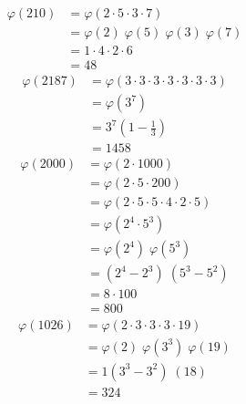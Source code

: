 \documentclass[12pt]{book}
\begin{document}
\begin{soln}
    \begin{align*}
        \varphi(210) & =\varphi(2\cdot 5\cdot3\cdot7)                   \\
                     & =\varphi(2)\;\varphi( 5)\;\varphi(3)\;\varphi(7) \\
                     & =1\cdot4\cdot2\cdot6                             \\
                     & =48
    \end{align*}
    \begin{align*}
        \varphi(2187) & =\varphi(3\cdot 3\cdot 3\cdot 3\cdot 3\cdot 3\cdot 3) \\
                      & =\varphi\left(3^7\right)                              \\
                      & =3^7\left( 1-\frac{1}{3} \right)                      \\
                      & =1458
    \end{align*}
    \begin{align*}
        \varphi(2000) & =\varphi(2\cdot 1000)                                \\
                      & =\varphi\left(2\cdot5\cdot200\right)                 \\
                      & =\varphi\left(2\cdot5\cdot5\cdot4\cdot2\cdot5\right) \\
                      & =\varphi\left( 2^4\cdot5^3\right)                    \\
                      & =\varphi\left( 2^4\right)\;\varphi\left(5^3\right)   \\
                      & =\left( 2^4-2^3\right)\;\left(5^3-5^2\right)         \\
                      & =8\cdot100                                           \\
                      & =800
    \end{align*}
    \begin{align*}
        \varphi(1026) & =\varphi(2\cdot 3\cdot3\cdot3\cdot19)                         \\
                      & =\varphi\left( 2\right)\;\varphi\left(3^3\right)\;\varphi(19) \\
                      & =1\left( 3^3-3^2\right)\;\left(18\right)                      \\
                      & =324
    \end{align*}
    \begin{align*}

\end{align*}
\end{soln}
\end{document}
